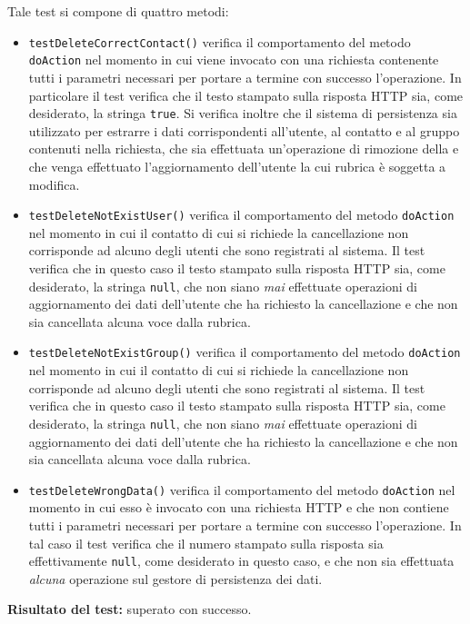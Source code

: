 \begin{itemize}
Tale test si compone di quattro metodi:
\begin{itemize}
\item \texttt{testDeleteCorrectContact()} verifica il comportamento del metodo \texttt{doAction} nel momento in cui viene invocato con una richiesta contenente tutti i parametri necessari per portare a termine con successo l'operazione. In particolare il test verifica che il testo stampato sulla risposta HTTP sia, come desiderato, la stringa \texttt{true}. Si verifica inoltre che il sistema di persistenza sia utilizzato per estrarre i dati corrispondenti all'utente, al contatto e al gruppo contenuti nella richiesta, che sia effettuata un'operazione di rimozione della  e che venga effettuato l'aggiornamento dell'utente la cui rubrica è soggetta a modifica.

\item \texttt{testDeleteNotExistUser()} verifica il comportamento del metodo \texttt{doAction} nel momento in cui il contatto di cui si richiede la cancellazione non corrisponde ad alcuno degli utenti che sono registrati al sistema. Il test verifica che in questo caso il testo stampato sulla risposta HTTP sia, come desiderato, la stringa \texttt{null}, che non siano \textit{mai} effettuate operazioni di aggiornamento dei dati dell'utente che ha richiesto la cancellazione e che non sia cancellata alcuna voce dalla rubrica.

\item \texttt{testDeleteNotExistGroup()} verifica il comportamento del metodo \texttt{doAction} nel momento in cui il contatto di cui si richiede la cancellazione non corrisponde ad alcuno degli utenti che sono registrati al sistema. Il test verifica che in questo caso il testo stampato sulla risposta HTTP sia, come desiderato, la stringa \texttt{null}, che non siano \textit{mai} effettuate operazioni di aggiornamento dei dati dell'utente che ha richiesto la cancellazione e che non sia cancellata alcuna voce dalla rubrica.

\item \texttt{testDeleteWrongData()} verifica il comportamento del metodo \texttt{doAction} nel momento in cui esso è invocato con una richiesta HTTP e che non contiene tutti i parametri necessari per portare a termine con successo l'operazione. In tal caso il test verifica che il numero stampato sulla risposta sia effettivamente \texttt{null}, come desiderato in questo caso, e che non sia effettuata \textit{alcuna} operazione sul gestore di persistenza dei dati.
\end{itemize}
\textbf{Risultato del test:} superato con successo.



\end{itemize}
